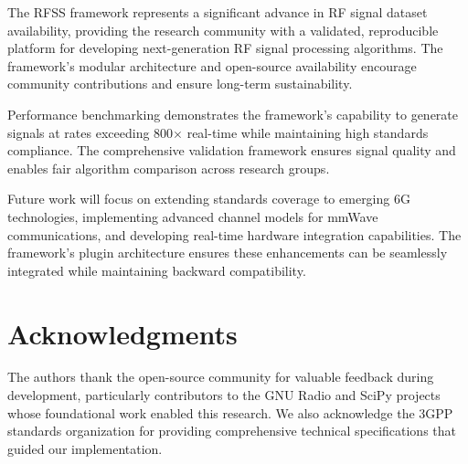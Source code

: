 \documentclass[conference]{IEEEtran}
\begin{document}
The RFSS framework represents a significant advance in RF signal dataset availability, providing the research community with a validated, reproducible platform for developing next-generation RF signal processing algorithms. The framework's modular architecture and open-source availability encourage community contributions and ensure long-term sustainability.

Performance benchmarking demonstrates the framework's capability to generate signals at rates exceeding 800$\times$ real-time while maintaining high standards compliance. The comprehensive validation framework ensures signal quality and enables fair algorithm comparison across research groups.

Future work will focus on extending standards coverage to emerging 6G technologies, implementing advanced channel models for mmWave communications, and developing real-time hardware integration capabilities. The framework's plugin architecture ensures these enhancements can be seamlessly integrated while maintaining backward compatibility.

\section*{Acknowledgments}

The authors thank the open-source community for valuable feedback during development, particularly contributors to the GNU Radio and SciPy projects whose foundational work enabled this research. We also acknowledge the 3GPP standards organization for providing comprehensive technical specifications that guided our implementation.



\end{document}
